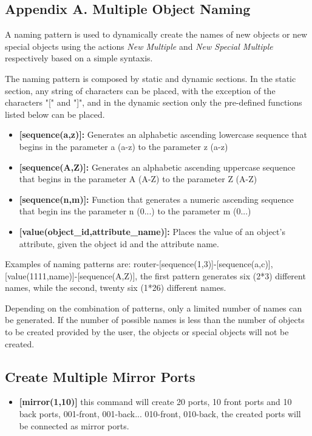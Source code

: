 \documentclass[a4paper]{article}
\begin{document}
		\clearpage
		\begin{appendices}
			\appendix
			\section{Appendix A. Multiple Object Naming} \label{app:AppendixA}
			A naming pattern is used to dynamically create the names of new objects or new special objects using the actions \textit{New Multiple} and \textit{New Special Multiple} respectively based on a simple syntaxis.			
			
			The naming pattern is composed by static and dynamic sections. In the static section, any string of characters can be placed, with the exception of the characters "[" and "]", and in the dynamic section only the pre-defined functions listed below can be placed.
			
			\begin{itemize}
				\item \textbf{[sequence(a,z)]:} Generates an alphabetic ascending lowercase  sequence that begins in the parameter a (a-z) to the parameter z (a-z)
				\item \textbf{[sequence(A,Z)]:} Generates an alphabetic ascending uppercase sequence that begins in the parameter A (A-Z) to the parameter Z (A-Z)
				\item \textbf{[sequence(n,m)]:} Function that generates a numeric ascending sequence that begin ins the parameter n (0...) to the parameter m (0...)
				\item \textbf{[value(object\_id,attribute\_name)]:} Places the value of an object's attribute, given the object id and the attribute name.
			\end{itemize}

		
			Examples of naming patterns are: router-[sequence(1,3)]-[sequence(a,c)], [value(1111,name)]-[sequence(A,Z)], the first pattern generates six (2*3) different names, while the second, twenty six (1*26) different names.
			
			Depending on the combination of patterns, only a limited number of names can be generated. If the number of possible names is less than the number of objects to be created provided by the user, the objects or special objects will not be created.
			\subsection{Create Multiple Mirror Ports} \label{app:multiple-mirror-ports}
				\begin{itemize}
					\item \textbf{[mirror(1,10)]} this command will create 20 ports, 10 front ports and 10 back ports, 001-front, 001-back... 010-front, 010-back, the created ports will be connected as mirror ports.
				\end{itemize}
			\newpage
			\appendix

\end{appendices}
\end{document}

